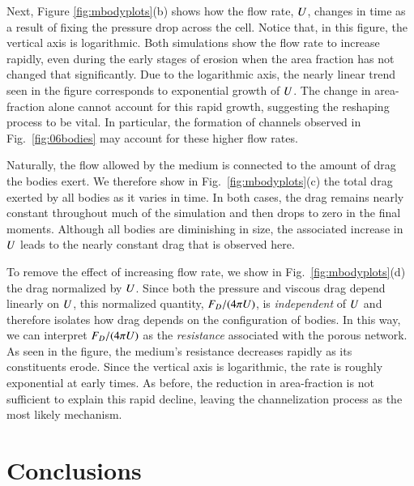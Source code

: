 \documentclass[preprint, 10pt]{elsarticle}
\begin{document}
Next, Figure \ref{fig:mbodyplots}(b) shows how the flow rate, $U$, changes in time as a result of fixing the pressure drop across the cell. Notice that, in this figure, the vertical axis is logarithmic. Both simulations show the flow rate to increase rapidly, even during the early stages of erosion when the area fraction has not changed that significantly. Due to the logarithmic axis, the nearly linear trend seen in the figure corresponds to exponential growth of $U$. The change in area-fraction alone cannot account for this rapid growth, suggesting the reshaping process to be vital. In particular, the formation of channels observed in Fig.~\ref{fig:06bodies} may account for these higher flow rates.

Naturally, the flow allowed by the medium is connected to the amount of drag the bodies exert. We therefore show in Fig.~\ref{fig:mbodyplots}(c) the total drag exerted by all bodies as it varies in time. In both cases, the drag remains nearly constant throughout much of the simulation and then drops to zero in the final moments. Although all bodies are diminishing in size, the associated increase in $U$ leads to the nearly constant drag that is observed here.

To remove the effect of increasing flow rate, we show in Fig.~\ref{fig:mbodyplots}(d) the drag normalized by $U$. Since both the pressure and viscous drag depend linearly on $U$, this normalized quantity, $F_D / (4 \pi U)$, is {\em independent} of $U$ and therefore isolates how drag depends on the configuration of bodies. In this way, we can interpret $F_D / (4 \pi U)$ as the {\em resistance} associated with the porous network. As seen in the figure, the medium's resistance decreases rapidly as its constituents erode. Since the vertical axis is logarithmic, the rate is roughly exponential at early times. As before, the reduction in area-fraction is not sufficient to explain this rapid decline, leaving the channelization process as the most likely mechanism.



\section{Conclusions\label{s:conclusions}}
\end{document}
